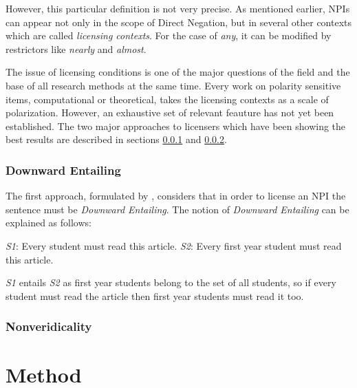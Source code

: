 \documentclass[a4paper,12pt]{article}
\begin{document}
    However, this particular definition is not very precise. As mentioned earlier, NPIs can appear not only in the scope of Direct Negation, but in several other contexts which are called \textit{licensing contexts}. For the case of \textit{any}, it can be modified by restrictors like \textit{nearly} and \textit{almost}.
    
    \par
    The issue of licensing conditions is one of the major questions of the field and the base of all research methods at the same time. Every work on polarity sensitive items, computational or theoretical, takes the licensing contexts as a scale of polarization. However, an exhaustive set of relevant feauture has not yet been established. The two major approaches to licensers which have been showing the best results are described in sections \ref{de} and \ref{nonveridicality}.
	
	\subsubsection{Downward Entailing}\label{de}
    
    The first approach, formulated by \parencite{ladusaw1979}, considers that in order to license an NPI the sentence must be \textit{Downward Entailing}. The notion of \textit{Downward Entailing} can be explained as follows:
    
    \begin{exe}
    	\ex \label{S1}
        \textit{S1}: Every student must read this article.
        \ex \label{S2}
        \textit{S2}: Every first year student must read this article.
    \end{exe}
    
    \textit{S1} entails \textit{S2} as first year students belong to the set of all students, so if every student must read the article then first year students must read it too.
    
	
	
	\subsubsection{Nonveridicality}\label{nonveridicality}
    
    \parencite{giannakidou1}
	
    \section{Method}
    
\end{document}

